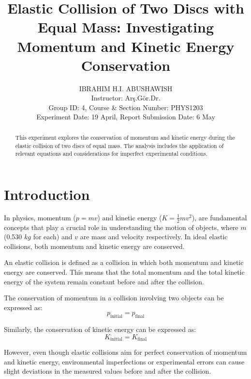\documentclass[journal]{IEEEtran}
\begin{document}
\title{Elastic Collision of Two Discs with Equal Mass: Investigating Momentum and Kinetic Energy Conservation}
\author{IBRAHIM H.I. ABUSHAWISH\\ Instructor: Arş.Gör.Dr.\\ Group ID: 4, Course \& Section Number: PHYS1203\\Experiment Date: 19 April, Report Submission Date: 6 May}

\maketitle

\begin{abstract}
This experiment explores the conservation of momentum and kinetic energy during the elastic collision of two discs of equal mass. The analysis includes the application of relevant equations and considerations for imperfect experimental conditions.
\end{abstract}

\section{Introduction}
In physics, momentum ($p = mv$) and kinetic energy ($K = \frac{1}{2} mv^2$), are fundamental concepts that play a crucial role in understanding the motion of objects, where $m$ (0.530 $kg$ for each) and $v$ are mass and velocity respectively. In ideal elastic collisions, both momentum and kinetic energy are conserved.

An elastic collision is defined as a collision in which both momentum and kinetic energy are conserved. This means that the total momentum and the total kinetic energy of the system remain constant before and after the collision.

The conservation of momentum in a collision involving two objects can be expressed as:
\begin{equation}
    p_{\text{initial}} = p_{\text{final}}
    \label{eq:momentum_con}
\end{equation}

Similarly, the conservation of kinetic energy can be expressed as:
\begin{equation}
    K_{\text{initial}} = K_{\text{final}}
    \label{eq:energy_con}
\end{equation}

However, even though elastic collisions aim for perfect conservation of momentum and kinetic energy, environmental imperfections or experimental errors can cause slight deviations in the measured values before and after the collision.
\end{document}
